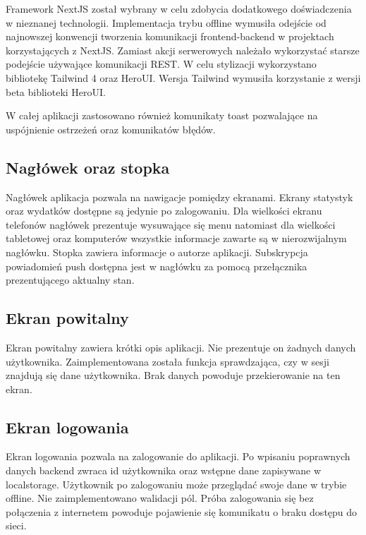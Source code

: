 \documentclass[11pt,titlepage]{article}
\begin{document}
Framework NextJS został wybrany w celu zdobycia dodatkowego doświadczenia w nieznanej technologii. Implementacja trybu offline wymusiła odejście od najnowszej konwencji tworzenia komunikacji frontend-backend w projektach korzystających z NextJS. Zamiast akcji serwerowych należało wykorzystać starsze podejście używające komunikacji REST.
W celu stylizacji wykorzystano bibliotekę Tailwind 4 oraz HeroUI. Wersja Tailwind wymusiła korzystanie z wersji beta biblioteki HeroUI.

W całej aplikacji zastosowano również komunikaty toast pozwalające na uspójnienie ostrzeżeń oraz komunikatów błędów.

\subsection{Nagłówek oraz stopka}
Nagłówek aplikacja pozwala na nawigacje pomiędzy ekranami. Ekrany statystyk oraz wydatków dostępne są jedynie po zalogowaniu. Dla wielkości ekranu telefonów nagłówek prezentuje wysuwające się menu natomiast dla wielkości tabletowej oraz komputerów wszystkie informacje zawarte są w nierozwijalnym nagłówku. Stopka zawiera informacje o autorze aplikacji.
Subskrypcja powiadomień push dostępna jest w nagłówku za pomocą przełącznika prezentującego aktualny stan.

\subsection{Ekran powitalny}
Ekran powitalny zawiera krótki opis aplikacji. Nie prezentuje on żadnych danych użytkownika. Zaimplementowana została funkcja sprawdzająca, czy w sesji znajdują się dane użytkownika. Brak danych powoduje przekierowanie na ten ekran.

\subsection{Ekran logowania}
Ekran logowania pozwala na zalogowanie do aplikacji. Po wpisaniu poprawnych danych backend zwraca id użytkownika oraz wstępne dane zapisywane w localstorage. Użytkownik po zalogowaniu może przeglądać swoje dane w trybie offline. Nie zaimplementowano walidacji pól. Próba zalogowania się bez połączenia z internetem powoduje pojawienie się komunikatu o braku dostępu do sieci.
\end{document}
